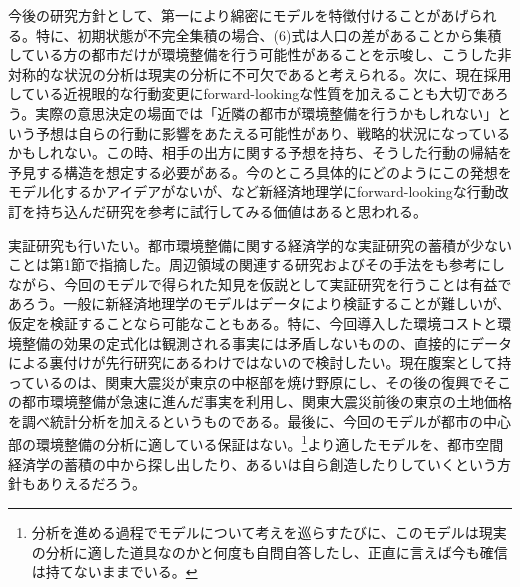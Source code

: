 \documentclass[a4paper]{jarticle}
\begin{document}
今後の研究方針として、第一により綿密にモデルを特徴付けることがあげられる。特に、初期状態が不完全集積の場合、(6)式は人口の差があることから集積している方の都市だけが環境整備を行う可能性があることを示唆し、こうした非対称的な状況の分析は現実の分析に不可欠であると考えられる。次に、現在採用している近視眼的な行動変更にforward-lookingな性質を加えることも大切であろう。実際の意思決定の場面では「近隣の都市が環境整備を行うかもしれない」という予想は自らの行動に影響をあたえる可能性があり、戦略的状況になっているかもしれない。この時、相手の出方に関する予想を持ち、そうした行動の帰結を予見する構造を想定する必要がある。今のところ具体的にどのようにこの発想をモデル化するかアイデアがないが、\citet{oyama09:aggl}など新経済地理学にforward-lookingな行動改訂を持ち込んだ研究を参考に試行してみる価値はあると思われる。

実証研究も行いたい。都市環境整備に関する経済学的な実証研究の蓄積が少ないことは第1節で指摘した。周辺領域の関連する研究およびその手法をも参考にしながら、今回のモデルで得られた知見を仮説として実証研究を行うことは有益であろう。一般に新経済地理学のモデルはデータにより検証することが難しいが、仮定を検証することなら可能なこともある。特に、今回導入した環境コストと環境整備の効果の定式化は観測される事実には矛盾しないものの、直接的にデータによる裏付けが先行研究にあるわけではないので検討したい。現在腹案として持っているのは、関東大震災が東京の中枢部を焼け野原にし、その後の復興でそこの都市環境整備が急速に進んだ事実を利用し、関東大震災前後の東京の土地価格を調べ統計分析を加えるというものである。最後に、今回のモデルが都市の中心部の環境整備の分析に適している保証はない。\footnote{分析を進める過程でモデルについて考えを巡らすたびに、このモデルは現実の分析に適した道具なのかと何度も自問自答したし、正直に言えば今も確信は持てないままでいる。}より適したモデルを、都市空間経済学の蓄積の中から探し出したり、あるいは自ら創造したりしていくという方針もありえるだろう。

{}

\end{document}
